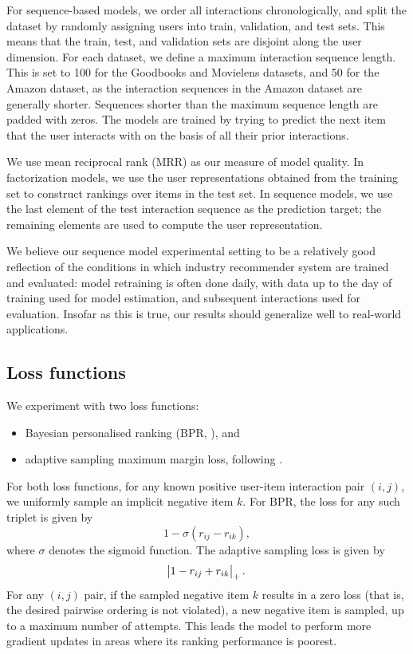 \documentclass[sigconf]{acmart}
\begin{document}
For sequence-based models, we order all interactions chronologically, and split the dataset by randomly assigning users into train, validation, and test sets. This means that the train, test, and validation sets are disjoint along the user dimension. For each dataset, we define a maximum interaction sequence length. This is set to 100 for the Goodbooks and Movielens datasets, and 50 for the Amazon dataset, as the interaction sequences in the Amazon dataset are generally shorter. Sequences shorter than the maximum sequence length are padded with zeros. The models are trained by trying to predict the next item that the user interacts with on the basis of all their prior interactions.

We use mean reciprocal rank (MRR) as our measure of model quality. In factorization models, we use the user representations obtained from the training set to construct rankings over items in the test set. In sequence models, we use the last element of the test interaction sequence as the prediction target; the remaining elements are used to compute the user representation.

We believe our sequence model experimental setting to be a relatively good reflection of the conditions in which industry recommender system are trained and evaluated: model retraining is often done daily, with data up to the day of training used for model estimation, and subsequent interactions used for evaluation. Insofar as this is true, our results should generalize well to real-world applications.

\subsection{Loss functions}

We experiment with two loss functions:
\begin{itemize}
\item Bayesian personalised ranking (BPR, \citet{rendle2009bpr}), and
\item adaptive sampling maximum margin loss, following \citet{weston2011wsabie}.
\end{itemize}
For both loss functions, for any known positive user-item interaction pair $(i, j)$, we uniformly sample an implicit negative item $k$. For BPR, the loss for any such triplet is given by
\begin{equation}
1 - \sigma\left(r_{ij} - r_{ik}\right),
\end{equation}
where $\sigma$ denotes the sigmoid function.
The adaptive sampling loss is given by
\begin{equation}
\abs{1 - r_{ij} + r_{ik}}_{+}.
\end{equation}
For any $(i, j)$ pair, if the sampled negative item $k$ results in a zero loss (that is, the desired pairwise ordering is not violated), a new negative item is sampled, up to a maximum number of attempts. This leads the model to perform more gradient updates in areas where its ranking performance is poorest.
\end{document}
